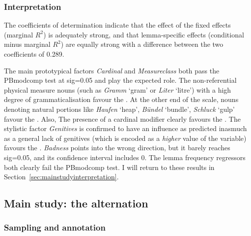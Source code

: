 \subsubsection{Interpretation}

The coefficients of determination indicate that the effect of the fixed effects (marginal $R^2$) is adequately strong, and that lemma-specific effects (conditional minus marginal $R^2$) are equally strong with a difference between the two coefficients of 0.289.

The main prototypical factors \textit{Cardinal} and \textit{Measureclass} both pass the PBmodcomp test at sig=0.05 and play the expected role.
The non-referential physical measure nouns (such as \textit{Gramm} `gram' or \textit{Liter} `litre') with a high degree of grammaticalisation favour the \NACb.
At the other end of the scale, nouns denoting natural portions like \textit{Haufen} `heap', \textit{Bündel} `bundle', \textit{Schluck} `gulp' favour the \PGCd.
Also, The presence of a cardinal modifier clearly favours the \NACb.
The stylistic factor \textit{Genitives} is confirmed to have an influence as predicted inasmuch as a general lack of genitives (which is encoded as a \textit{higher} value of the variable) favours the \NACb.
\textit{Badness} points into the wrong direction, but it barely reaches sig=0.05, and its confidence interval includes 0.
The lemma frequency regressors both clearly fail the PBmodcomp test.
I will return to these results in Section~\ref{sec:mainstudyinterpretation}.

\subsection{Main study: the alternation}
\label{sec:annotation}
\label{sec:corpushierarchicalmodel}

\subsubsection{Sampling and annotation}
\label{sec:mainstudysampling}

